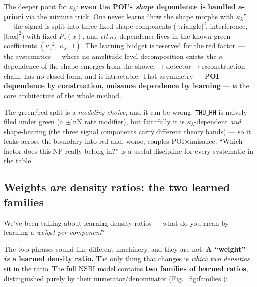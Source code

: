 \documentclass[11pt]{article}
\newcommand{\kl}{\ensuremath{\kappa_\lambda}}
\begin{document}
The deeper point for \kl: \textbf{even the POI's \emph{shape} dependence is handled a-priori} via the mixture
trick. One never learns ``how the shape morphs with \kl'' --- the signal is split into three fixed-shape
components ($|\text{triangle}|^2$, interference, $|\text{box}|^2$) with fixed $P_s(x)$, and \emph{all}
\kl-dependence lives in the known green coefficients $(\kl^2,\ \kl,\ 1)$. The learning budget is reserved for
the red factor --- the systematics --- where no amplitude-level decomposition exists: the $\alpha$-dependence of
the shape emerges from the shower$\to$detector$\to$reconstruction chain, has no closed form, and is intractable.
That asymmetry --- \textbf{POI dependence by construction, nuisance dependence by learning} --- is the core
architecture of the whole method.

\begin{keybox}
The green/red split is a \emph{modeling choice}, and it can be wrong. \texttt{THU\_HH} is naively filed under
green (a $\pm$lnN rate modifier), but faithfully it is \kl-dependent \emph{and} shape-bearing (the three signal
components carry different theory bands) --- so it leaks across the boundary into red and, worse, couples
POI$\times$nuisance. ``Which factor does this NP really belong in?'' is a useful discipline for every
systematic in the table.
\end{keybox}

\subsection{Weights \emph{are} density ratios: the two learned families}\label{sec:families}

\begin{qbox}[Question]
We've been talking about learning density ratios --- what do you mean by learning a \emph{weight per
component}?
\end{qbox}

The two phrases sound like different machinery, and they are not. \textbf{A ``weight'' \emph{is} a learned
density ratio.} The only thing that changes is \emph{which two densities} sit in the ratio. The full NSBI model
contains \textbf{two families of learned ratios}, distinguished purely by their numerator/denominator
(Fig.~\ref{fig:families}):
\end{document}
